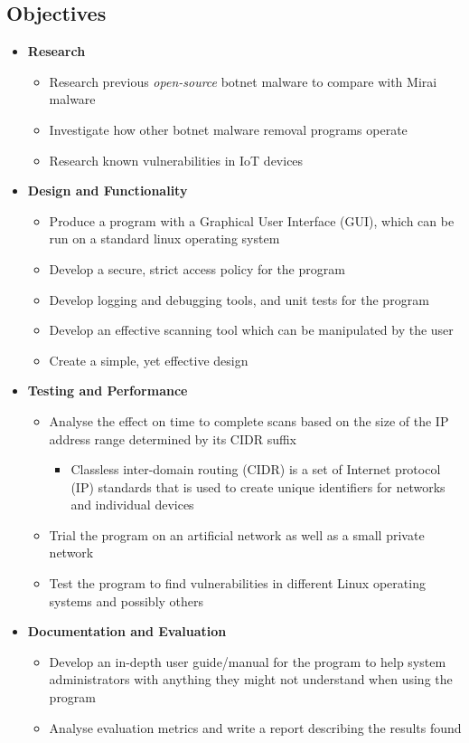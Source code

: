 \begin{flushleft}
	\subsection{Objectives}
	\begin{itemize}
		\item{\textbf{Research}}
		\begin{itemize}
			\item{Research previous \textit{open-source} botnet malware to compare with Mirai malware}
			\item{Investigate how other botnet malware removal programs operate}
      \item{Research known vulnerabilities in IoT devices}
		\end{itemize}
		\item{\textbf{Design and Functionality}}
		\begin{itemize}
			\item{Produce a program with a Graphical User Interface (GUI), which can be run on a standard linux operating system}
			\item{Develop a secure, strict access policy for the program}
			\item{Develop logging and debugging tools, and unit tests for the program}
			\item{Develop an effective scanning tool which can be manipulated by the user}
			\item{Create a simple, yet effective design}
		\end{itemize}
		\item{\textbf{Testing and Performance}}
		\begin{itemize}
			\item{Analyse the effect on time to complete scans based on the size of the IP address range determined by its CIDR suffix}
			\begin{itemize}
				\item{Classless inter-domain routing (CIDR) is a set of Internet protocol (IP) standards that is used to create unique identifiers for networks and individual devices\textsuperscript{\cite{cidr}}}
			\end{itemize}
			\item{Trial the program on an artificial network as well as a small private network}
			\item{Test the program to find vulnerabilities in different Linux operating systems and possibly others}
		\end{itemize}
		\item{\textbf{Documentation and Evaluation}}
		\begin{itemize}
			\item{Develop an in-depth user guide/manual for the program to help system administrators with anything they might not understand when using the program}
			\item{Analyse evaluation metrics and write a report describing the results found}
		\end{itemize}
	\end{itemize}

\end{flushleft}
